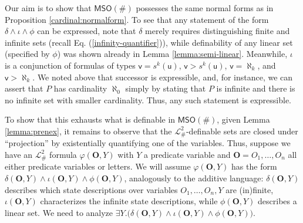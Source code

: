 \documentclass[12pt,oneside,reqno]{amsart}
\theoremstyle{definition}
\begin{document}
Our aim is to show that $\mathsf{MSO}(\#)$ possesses the same normal forms as in Proposition \ref{cardinal:normalform}.  To see that any statement of the form  $\delta \wedge \iota \wedge \phi$ can be expressed, note that $\delta$ merely requires distinguishing finite and infinite sets (recall Eq. (\ref{infinity-quantifier})), while definability of any linear set (specified by $\phi$) was shown already in Lemma \ref{lemma:semi-linear}. Meanwhile, $\iota$ is a conjunction of formulas of types $\mathsf{v}=s^k(\mathsf{u})$, $\mathsf{v}>s^k(\mathsf{u})$, $\mathsf{v} = \aleph_k$, and $\mathsf{v}>\aleph_k$. We noted above that successor is expressible, and, for instance, we can assert that $P$ has cardinality $\aleph_0$ simply by stating that $P$ is infinite and there is no infinite set with smaller cardinality. Thus, any such statement is expressible.

To show that this exhausts what is definable in $\mathsf{MSO}(\#)$, given Lemma \ref{lemma:prenex}, it remains to observe that the $\mathcal{L}_\#^2$-definable sets are closed under ``projection'' by existentially quantifying one of the variables. Thus, suppose we have an $\mathcal{L}_\#^2$ formula $\varphi(\mathbf{O},Y)$ with $Y$ a predicate variable and $\mathbf{O}=O_1,\dots,O_n$ all either predicate variables or letters. We will assume $\varphi(\mathbf{O},Y)$ has the form  $\delta(\mathbf{O},Y) \wedge \iota(\mathbf{O},Y) \wedge \phi(\mathbf{O},Y)$, analogously to the additive language: $\delta(\mathbf{O},Y)$ describes which state descriptions over variables $O_1,\dots,O_n,Y$ are (in)finite, $\iota(\mathbf{O},Y)$ characterizes the infinite state descriptions, while $\phi(\mathbf{O},Y)$ describes a linear set. We need to analyze $\exists Y.\big(\delta(\mathbf{O},Y) \wedge \iota(\mathbf{O},Y) \wedge \phi(\mathbf{O},Y)\big)$. %
\end{document}
